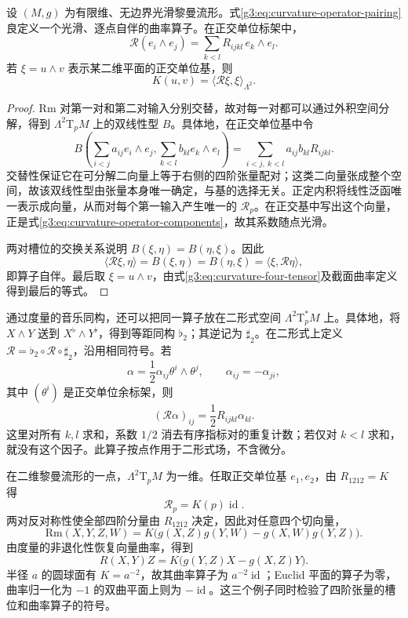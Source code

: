 \begin{proposition}\label{g3:prop:curvature-operator-self-adjoint}
	设 \((M,g)\) 为有限维、无边界光滑黎曼流形。式\eqref{g3:eq:curvature-operator-pairing}良定义一个光滑、逐点自伴的曲率算子。在正交单位标架中，
	\begin{equation}\label{g3:eq:curvature-operator-components}
		\mathcal R(e_i\wedge e_j)
		=\sum_{k<l}R_{ijkl}\,e_k\wedge e_l.
	\end{equation}
	若 \(\xi=u\wedge v\) 表示某二维平面的正交单位基，则
	\[
		K(u,v)=\langle\mathcal R\xi,\xi\rangle_{\Lambda^2}.
	\]
\end{proposition}
\begin{proof}
	\(\mathrm{Rm}\) 对第一对和第二对输入分别交替，故对每一对都可以通过外积空间分解，得到 \(\Lambda^2\mathrm{T}_pM\) 上的双线性型 \(B\)。具体地，在正交单位基中令
	\[
		B\left(\sum_{i<j}a_{ij}e_i\wedge e_j,
			\sum_{k<l}b_{kl}e_k\wedge e_l\right)
		=\sum_{i<j,\ k<l}a_{ij}b_{kl}R_{ijkl}.
	\]
	交替性保证它在可分解二向量上等于右侧的四阶张量配对；这类二向量张成整个空间，故该双线性型由张量本身唯一确定，与基的选择无关。正定内积将线性泛函唯一表示成向量，从而对每个第一输入产生唯一的 \(\mathcal R_p\)。在正交基中写出这个向量，正是式\eqref{g3:eq:curvature-operator-components}，故其系数随点光滑。

	两对槽位的交换关系说明 \(B(\xi,\eta)=B(\eta,\xi)\)。因此
	\[
		\langle\mathcal R\xi,\eta\rangle
		=B(\xi,\eta)=B(\eta,\xi)
		=\langle\xi,\mathcal R\eta\rangle,
	\]
	即算子自伴。最后取 \(\xi=u\wedge v\)，由式\eqref{g3:eq:curvature-four-tensor}及截面曲率定义得到最后的等式。
\end{proof}

通过度量的音乐同构，还可以把同一算子放在二形式空间 \(\Lambda^2\mathrm{T}_p^*M\) 上。具体地，将 \(X\wedge Y\) 送到 \(X^\flat\wedge Y^\flat\)，得到等距同构 \(\flat_2\)；其逆记为 \(\sharp_2\)。在二形式上定义 \(\mathcal R=\flat_2\circ\mathcal R\circ\sharp_2\)，沿用相同符号。若
\[
	\alpha=\frac12\alpha_{ij}\theta^i\wedge\theta^j,\qquad
	\alpha_{ij}=-\alpha_{ji},
\]
其中 \((\theta^i)\) 是正交单位余标架，则
\begin{equation}\label{g3:eq:curvature-operator-two-forms}
	(\mathcal R\alpha)_{ij}=\frac12R_{ijkl}\alpha_{kl}.
\end{equation}
这里对所有 \(k,l\) 求和，系数 \(1/2\) 消去有序指标对的重复计数；若仅对 \(k<l\) 求和，就没有这个因子。此算子按点作用于二形式场，不含微分。

\begin{example}\label{g3:exm:surface-curvature-operator}
	在二维黎曼流形的一点，\(\Lambda^2\mathrm{T}_pM\) 为一维。任取正交单位基 \(e_1,e_2\)，由 \(R_{1212}=K\) 得
	\[
		\mathcal R_p=K(p)\operatorname{id}.
	\]
	两对反对称性使全部四阶分量由 \(R_{1212}\) 决定，因此对任意四个切向量，
	\[
		\mathrm{Rm}(X,Y,Z,W)
		=K\bigl(g(X,Z)g(Y,W)-g(X,W)g(Y,Z)\bigr).
	\]
	由度量的非退化性恢复向量曲率，得到
	\[
		R(X,Y)Z=K\bigl(g(Y,Z)X-g(X,Z)Y\bigr).
	\]
	半径 \(a\) 的圆球面有 \(K=a^{-2}\)，故其曲率算子为 \(a^{-2}\operatorname{id}\)；Euclid 平面的算子为零，曲率归一化为 \(-1\) 的双曲平面上则为 \(-\operatorname{id}\)。这三个例子同时检验了四阶张量的槽位和曲率算子的符号。
\end{example}

